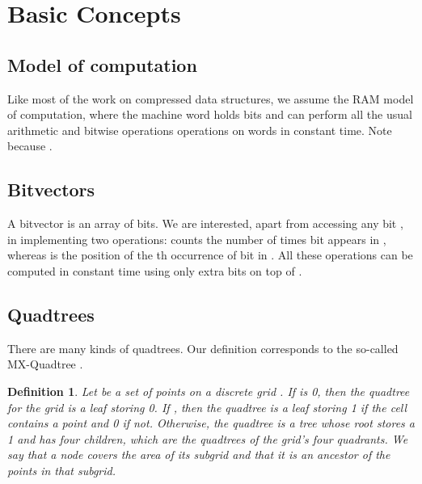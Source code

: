 \documentclass{elsarticle}
\newtheorem{definition}{Definition}
\begin{document}
\section{Basic Concepts}
\label{sec:related}

\subsection{Model of computation}

Like most of the work on compressed data structures, we assume the RAM model of computation, where the machine word holds  bits and can perform all the usual arithmetic and bitwise operations operations on words in constant time. Note  because .

\subsection{Bitvectors}

A bitvector is an array  of bits. We are interested, apart from accessing any bit , in implementing two operations:  counts the number of times bit  appears in , whereas  is the position of the th occurrence of bit  in . All these operations can be computed in constant time using only  extra bits on top of  \cite{Cla96,Mun96}.

\subsection{Quadtrees} \label{sec:quadtrees}

There are many kinds of quadtrees. Our definition corresponds to the so-called 
MX-Quadtree \cite{WF90,Sam06}.

\begin{definition}
Let  be a set of  points on a discrete grid . If  is 0, 
then the quadtree for the grid is a leaf storing 0. If , then the 
quadtree is a leaf storing 1 if the cell contains a point and 0 if not.
Otherwise, the quadtree is a tree whose root stores a 1 
and has four children, which are the quadtrees of the grid's four quadrants.
We say that a node {\em covers} the area of its subgrid and that it is an 
{\em ancestor} of the points in that subgrid.
\end{definition}
\end{document}
